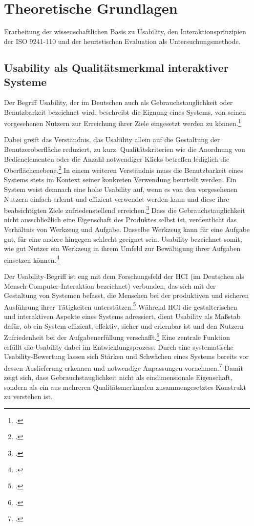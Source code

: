 \chapter{Theoretische Grundlagen}
\label{chapter:kapitel2}

Erarbeitung der wissenschaftlichen Basis zu Usability, den Interaktionsprinzipien der ISO 9241-110 und der heuristischen Evaluation als 
Untersuchungsmethode.

\section{Usability als Qualitätsmerkmal interaktiver Systeme}
\label{section:usability}

Der Begriff Usability, der im Deutschen auch als Gebrauchstauglichkeit oder Benutzbarkeit bezeichnet wird, beschreibt die 
Eignung eines Systems, von seinen vorgesehenen Nutzern zur Erreichung ihrer Ziele eingesetzt werden zu 
können.\footcite[Vgl.][S. 3]{richter_2010}

Dabei greift das Verständnis, das Usability allein auf die Gestaltung der Benutzeroberfläche reduziert, zu kurz. Qualitätskriterien 
wie die Anordnung von Bedienelementen oder die Anzahl notwendiger Klicks betreffen lediglich die 
Oberflächenebene.\footcite[Vgl.][S. 3]{richter_2010} In einem weiteren Verständnis muss die Benutzbarkeit eines Systems 
stets im Kontext seiner konkreten Verwendung beurteilt werden. Ein System weist demnach eine hohe Usability auf, wenn es von den 
vorgesehenen Nutzern einfach erlernt und effizient verwendet werden kann und diese ihre beabsichtigten Ziele zufriedenstellend 
erreichen.\footcite[Vgl.][S. 3]{richter_2010} Dass die Gebrauchstauglichkeit nicht ausschließlich eine Eigenschaft des 
Produktes selbst ist, verdeutlicht das Verhältnis von Werkzeug und Aufgabe. Dasselbe Werkzeug kann für eine Aufgabe gut, für eine 
andere hingegen schlecht geeignet sein. Usability bezeichnet somit, wie gut Nutzer ein Werkzeug in ihrem Umfeld zur Bewältigung ihrer 
Aufgaben einsetzen können.\footcite[Vgl.][S. 5]{richter_2010}

Der Usability-Begriff ist eng mit dem Forschungsfeld der \ac{HCI} (im Deutschen als Mensch-Computer-Interaktion bezeichnet) verbunden, 
das sich mit der Gestaltung von Systemen befasst, die Menschen bei der produktiven und sicheren Ausführung ihrer Tätigkeiten 
unterstützen.\footcite[Vgl.][S. 23]{issa_sustainable_2022} Während HCI die gestalterischen und interaktiven Aspekte eines Systems 
adressiert, dient Usability als Maßstab dafür, ob ein System effizient, effektiv, sicher und erlernbar ist und den Nutzern 
Zufriedenheit bei der Aufgabenerfüllung verschafft.\footcite[Vgl.][S. 4]{issa_sustainable_2022} Eine zentrale Funktion erfüllt die 
Usability dabei im Entwicklungsprozess. Durch eine systematische Usability-Bewertung lassen sich Stärken und Schwächen eines Systems 
bereits vor dessen Auslieferung erkennen und notwendige Anpassungen vornehmen.\footcite[Vgl.][S. 4]{issa_sustainable_2022} Damit zeigt 
sich, dass Gebrauchstauglichkeit nicht als eindimensionale Eigenschaft, sondern als ein aus mehreren Qualitätsmerkmalen zusammengesetztes 
Konstrukt zu verstehen ist.

